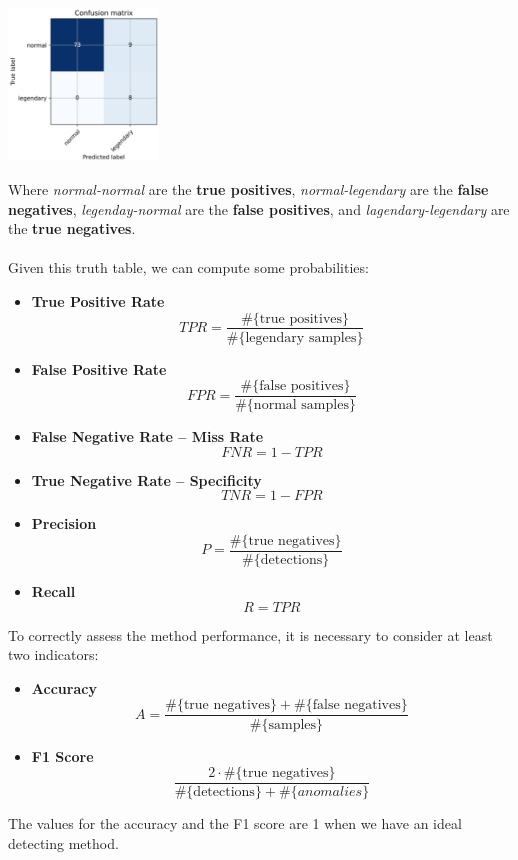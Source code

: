 \documentclass{article}
\begin{document}
\begin{center}
	\includegraphics[width=4cm]{assets/confusion_matrix.png}
\end{center}
Where \textit{normal-normal} are the \textbf{true positives}, \textit{normal-legendary} are the \textbf{false negatives}, \textit{legenday-normal} are the \textbf{false positives}, and \textit{lagendary-legendary} are the \textbf{true negatives}. \\ \\
Given this truth table, we can compute some probabilities:

\begin{itemize}
	\item \textbf{True Positive Rate}
	\[ TPR = \frac{\#\{ \text{true positives} \}}{\#\{ \text{legendary samples} \}} \]
	
	\item \textbf{False Positive Rate}
	\[ FPR = \frac{\#\{ \text{false positives} \}}{\#\{ \text{normal samples} \}} \]
	
	\item \textbf{False Negative Rate -- Miss Rate}
	\[ FNR = 1 - TPR \]
	
	\item \textbf{True Negative Rate -- Specificity}
	\[ TNR = 1 - FPR \]
	
	\item \textbf{Precision}
	\[ P = \frac{\#\{ \text{true negatives} \}}{\#\{ \text{detections} \}} \]
	
	\item \textbf{Recall}
	\[ R = TPR \]
\end{itemize}
To correctly assess the method performance, it is necessary to consider at least two indicators:

\begin{itemize}
	\item \textbf{Accuracy}
	\[ A = \frac{\#\{ \text{true negatives}\} + \#\{\text{false negatives} \}}{\#\{ \text{samples} \}} \]
	
	\item \textbf{F1 Score}
	\[ \frac{2 \cdot \#\{ \text{true negatives}\}}{\#\{ \text{detections} \} + \#\{ anomalies \}} \]
\end{itemize}
The values for the accuracy and the F1 score are 1 when we have an ideal detecting method.
\end{document}
